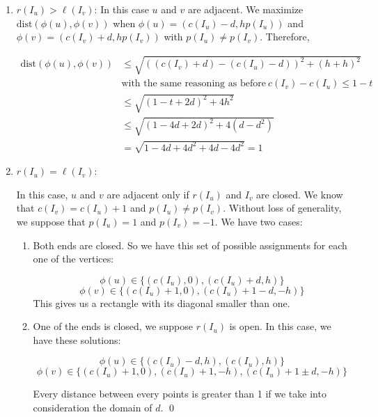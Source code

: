 {\begin{enumerate}
    $$\text{dist}(\phi(u),\phi(v)) \geq (c(I_v)-d) - (c(I_u)+d) = c(I_v)-c(I_u) - 2d$$

    By definition, $s \leq l(I_v)-r(I_u)$. If we take the centers, then $s \leq c(I_v)-c(I_u) -1$, which means finally that $s +1 \leq c(I_v)-c(I_u)$

    $$\text{dist}(\phi(u),\phi(v)) \geq s + 1 - 2d > 1$$

  \item $r(I_u) > \ell(I_v)$:
    In this case $u$ and $v$ are adjacent. We maximize $\text{dist}(\phi(u),\phi(v))$ when $\phi(u) = (c(I_u)-d,hp(I_u))$ and $\phi(v) = (c(I_v)+d,hp(I_v))$ with $p(I_u) \neq p(I_v)$. Therefore,

\[    \begin{split}
    \text{dist}(\phi(u),\phi(v)) & \leq \sqrt{((c(I_v)+d)-(c(I_u)-d))^2 + (h+h)^2} \\
     & \text{with the same reasoning as before}\  c(I_v)-c(I_u) \leq 1-t\\
     & \leq \sqrt{(1-t+2d)^2 + 4h^2} \\
     & \leq \sqrt{(1-4d+2d)^2 + 4(d-d^2)} \\
     & = \sqrt{1-4d+4d^2 + 4d-4d^2} = 1
    \end{split}
\]

  \item $r(I_u) = \ell(I_v)$:

  In this case, $u$ and $v$ are adjacent only if $r(I_u)$ and $I_v$ are closed. We know that $c(I_v) = c(I_u)+1$ and $p(I_u) \neq p(I_v)$. Without loss of generality, we suppose that $p(I_u) = 1$ and $p(I_v) = -1$. We have two cases:
  \begin{enumerate}
    \item Both ends are closed. So we have this set of possible assignments for each one of the vertices:

    $$\phi(u) \in \{(c(I_u),0), (c(I_u)+d,h)\}$$
    $$\phi(v) \in \{(c(I_u)+1,0), (c(I_u)+1-d,-h)\}$$
    This gives us a rectangle with its diagonal smaller than one.

\item One of the ends is closed, we suppose $r(I_u)$ is open. In this case, we have these solutions:

  $$\phi(u) \in \{(c(I_u)-d,h), (c(I_u),h)\}$$
  $$\phi(v) \in \{(c(I_u)+1,0), (c(I_u)+1,-h), (c(I_u)+1\pm d,-h)\}$$

  Every distance between every points is greater than 1 if we take into consideration the domain of $d$. \qed

  \end{enumerate}
\end{enumerate}
}

